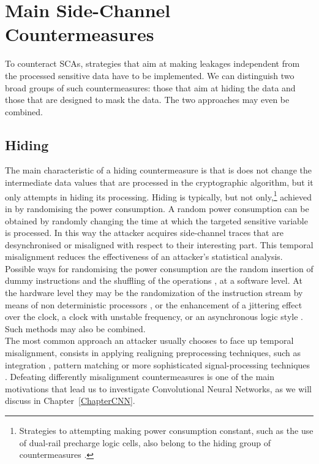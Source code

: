\section{Main Side-Channel Countermeasures}\label{sec:countermeasures}
To counteract SCAs, strategies that aim at making leakages independent from the processed sensitive data have to be implemented. We can distinguish two broad groups of such countermeasures: 
those that aim at hiding the data and those that are designed to mask the data. The two approaches may even be combined.

\subsection{Hiding}
The main characteristic of a hiding countermeasure is that is does not change the intermediate data values that are processed in the cryptographic algorithm, but it only attempts in hiding its processing. Hiding is typically, but not only,\footnote{Strategies to attempting making power consumption constant, such as the use of dual-rail precharge logic cells, also belong to the hiding group of countermeasures \cite{popp2005masked}.} achieved in by randomising the power consumption. A random power consumption can be obtained by randomly changing the time at which the targeted sensitive variable is processed. In this way the attacker acquires side-channel traces that are desynchronised or misaligned with respect to their interesting part. This temporal misalignment reduces the effectiveness of an attacker's statistical analysis. Possible ways for randomising the power consumption are the random insertion of dummy instructions \cite{coron2009efficient,coron2010analysis} and the shuffling of the operations \cite{veyrat2012shuffling}, at a software level. At the hardware level they may be the randomization of the instruction stream by means of non deterministic processors \cite{irwin2002instruction,may2001non}, or the enhancement of a jittering effect over the clock, \via a clock with unstable frequency, or \via an asynchronous logic style \cite{moore2002improving,moore2003balanced}. Such methods may also be combined. \\

The most common approach an attacker usually chooses to face up temporal misalignment, consists in applying realigning preprocessing techniques, such as integration \cite{mangard2004hardware,mangard2008power}, pattern matching \cite{nagashima2007dpa} or more sophisticated signal-processing techniques \cite{van2011improving}. Defeating differently misalignment countermeasures is one of the main motivations that lead us to investigate Convolutional Neural Networks, as we will discuss in Chapter~\ref{ChapterCNN}.


